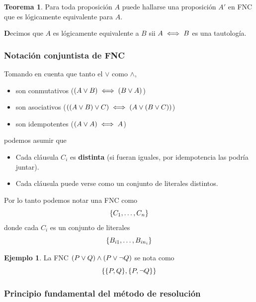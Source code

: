 \documentclass{report}
\theoremstyle{definition} %
\newtheorem{theorem}{Teorema}[chapter]
\newtheorem*{example*}{Ejemplo}
\newenvironment{nota}[1]
    {\begin{leftbar}\textbf{#1}}
    {\end{leftbar}}
\begin{document}
\begin{theorem}
    Para toda proposición $A$ puede hallarse una proposición $A'$ en FNC que es
    lógicamente equivalente para $A$.
\end{theorem}

\begin{nota}
    Decimos que $A$ es lógicamente equivalente a $B$ sii $A \iff B$ es una
    tautología.
\end{nota}

\subsubsection{Notación conjuntista de FNC}

Tomando en cuenta que tanto el $\vee$ como $\wedge$,

\begin{itemize}
    \item son conmutativos ($(A \vee B) \iff (B \vee A)$)
    \item son asociativos
    ($((A \vee B) \vee C) \iff (A \vee (B \vee C))$)
    \item son idempotentes ($(A \vee A) \iff A$)
\end{itemize}

podemos asumir que 

\begin{itemize}
    \item Cada cláusula $C_i$ es \textbf{distinta} (si fueran iguales, por
    idempotencia las podría juntar).
    \item Cada cláusula puede verse como un conjunto de literales distintos.
\end{itemize}

Por lo tanto podemos notar una FNC como
\[
    \{ C_1, \dots, C_n \}
\]
donde cada $C_i$ es un conjunto de literales
\[
    \{ B_{i1}, \dots, B_{in_i} \}
\]

\begin{example*}
    La FNC $(P \vee Q) \wedge (P \vee \neg Q)$ se nota como
    \[
        \{ 
            \{ P, Q \},
            \{ P, \neg Q \}
         \}
    \]
\end{example*}

\subsubsection{Principio fundamental del método de resolución}\label{sec:logico-lpo-resol-ppio-fundamental}
\end{document}
